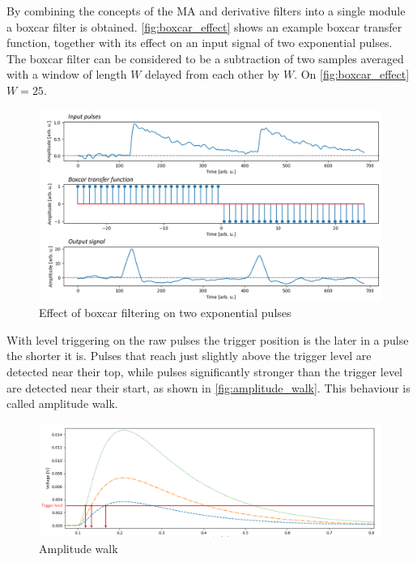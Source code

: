 By combining the concepts of the MA and derivative filters
into a single module a boxcar filter is obtained. 
\autoref{fig:boxcar_effect} shows an example boxcar transfer function,
together with its effect on an input signal of two exponential pulses.
The boxcar filter can be considered
to be a subtraction of two samples averaged with a window
of length $W$ delayed from each other by $W$. 
On \autoref{fig:boxcar_effect} $W=25$.
\begin{figure}[H]
  \centering
  \includegraphics[width=\linewidth]{media/boxcar_effect.png}
  \caption{Effect of boxcar filtering on two exponential pulses}
  \label{fig:boxcar_effect} 
\end{figure}


With level triggering
on the raw pulses the trigger position is the later in a pulse the 
shorter it is. Pulses that reach just slightly above the trigger level
are detected near their top, while pulses significantly stronger
than the trigger level are detected near their start, as shown in 
\autoref{fig:amplitude_walk}. This behaviour is called amplitude walk.

\begin{figure}[H]
  \centering
  \includegraphics[width=\linewidth]{media/amplitude_walk.png}
  \caption{Amplitude walk}
  \label{fig:amplitude_walk} 
\end{figure}


